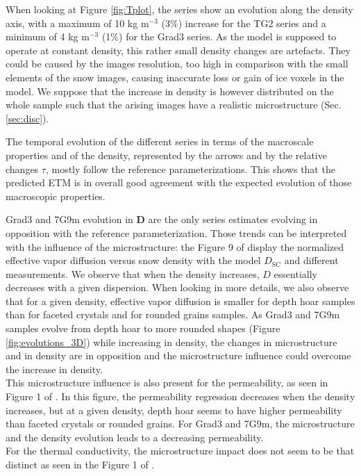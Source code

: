 \documentclass[draft,ms]{agujournal2019}
\begin{document}
When looking at Figure \ref{fig:Tplot}, the series show an evolution along the density axis, with a maximum of 10 kg m$^{-3}$ (3\%) increase for the TG2 series and a minimum of 4 kg m$^{-3}$ (1\%) for the Grad3 series. As the model is supposed to operate at constant density, this rather small density changes are artefacts. They could be caused by the images resolution, too high in comparison with the small elements of the snow images, causing inaccurate loss or gain of ice voxels in the model. We suppose that the increase in density is however distributed on the whole sample such that the arising images have a realistic microstructure (Sec. \ref{sec:disc}).

The temporal evolution of the different series in terms of the macroscale properties and of the density, represented by the arrows and by the relative changes $\tau$, mostly follow the reference parameterizations. This shows that the predicted ETM is in overall good agreement with the expected evolution of those macroscopic properties. 

Grad3 and 7G9m evolution in \textbf{D} are the only series estimates evolving in opposition with the reference parameterization. Those trends can be interpreted with the influence of the microstructure: the Figure 9 of  display the normalized effective vapor diffusion versus snow density with the model $D_{\mathrm{SC}}$ and different measurements. We observe that when the density increases, $D$ essentially decreases with a given dispersion. When looking in more details, we also observe that for a given density, effective vapor diffusion is smaller for depth hoar samples than for faceted crystals and for rounded grains samples. As Grad3 and 7G9m samples evolve from depth hoar to more rounded shapes (Figure \ref{fig:evolutions_3D}) while increasing in density, the changes in microstructure and in density are in opposition and the microstructure influence could overcome the increase in density. \\
This microstructure influence is also present for the permeability, as seen in Figure 1 of . In this figure, the permeability regression decreases when the density increases, but at a given density, depth hoar seems to have higher permeability than faceted crystals or rounded grains. For Grad3 and 7G9m, the microstructure and the density evolution leads to a decreasing permeability.\\
For the thermal conductivity, the microstructure impact does not seem to be that distinct as seen in the Figure 1 of .
\end{document}

